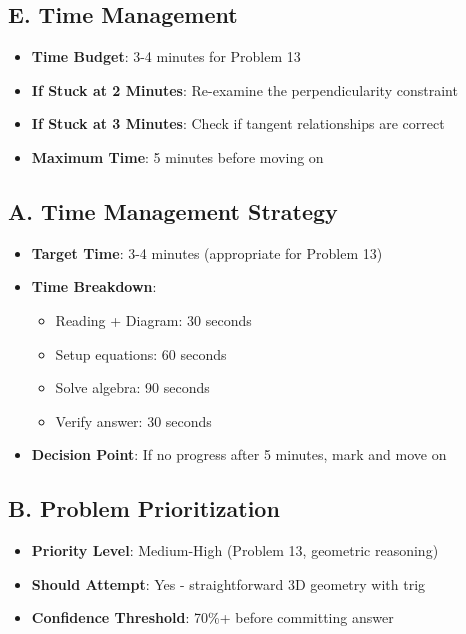 \documentclass[12pt]{article}
\begin{document}
\begin{roadmapbox}
\subsection*{E. Time Management}
\begin{itemize}[leftmargin=*]
    \item \textbf{Time Budget}: 3-4 minutes for Problem 13
    \item \textbf{If Stuck at 2 Minutes}: Re-examine the perpendicularity constraint
    \item \textbf{If Stuck at 3 Minutes}: Check if tangent relationships are correct
    \item \textbf{Maximum Time}: 5 minutes before moving on
\end{itemize}
\end{roadmapbox}

\begin{competitionbox}
\subsection*{A. Time Management Strategy}
\begin{itemize}[leftmargin=*]
    \item \textbf{Target Time}: 3-4 minutes (appropriate for Problem 13)
    \item \textbf{Time Breakdown}:
    \begin{itemize}
        \item Reading + Diagram: 30 seconds
        \item Setup equations: 60 seconds
        \item Solve algebra: 90 seconds
        \item Verify answer: 30 seconds
    \end{itemize}
    \item \textbf{Decision Point}: If no progress after 5 minutes, mark and move on
\end{itemize}

\subsection*{B. Problem Prioritization}
\begin{itemize}[leftmargin=*]
    \item \textbf{Priority Level}: Medium-High (Problem 13, geometric reasoning)
    \item \textbf{Should Attempt}: Yes - straightforward 3D geometry with trig
    \item \textbf{Confidence Threshold}: 70\%+ before committing answer
\end{itemize}


\end{competitionbox}
\end{document}
